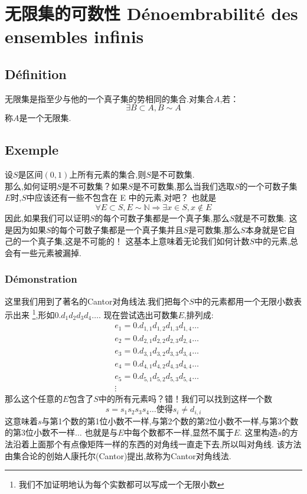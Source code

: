 \documentclass[12pt, a4paper, oneside]{ctexbook}
\begin{document}
\section{无限集的可数性 Dénoembrabilité des ensembles infinis}
  \subsection{Définition}
  无限集是指至少与他的一个真子集的势相同的集合.对集合$A$,若：
  $$
    \exists B\subset A, B\sim A
  $$
  称$A$是一个无限集.
  \subsection{Exemple}
  设$S$是区间$(0,1)$上所有元素的集合,则$S$是不可数集.\\

  那么,如何证明$S$是不可数集？如果$S$是不可数集,那么当我们选取$S$的一个可数子集$E$时,$S$中应该还有一些不包含在 E 中的元素,对吧？
  也就是
  $$
    \forall E\subset S,E\sim \mathbb{N}\Rightarrow \exists x\in S,x\notin E 
  $$
  因此,如果我们可以证明$S$的每个可数子集都是一个真子集,那么$S$就是不可数集.
  这是因为如果$S$的每个可数子集都是一个真子集并且$S$是可数集,那么$S$本身就是它自己的一个真子集,这是不可能的！
  这基本上意味着无论我们如何计数$S$中的元素,总会有一些元素被漏掉.
  \subsubsection{Démonstration}
  这里我们用到了著名的Cantor对角线法.我们把每个$S$中的元素都用一个无限小数表示出来
  \footnote{我们不加证明地认为每个实数都可以写成一个无限小数},形如$0.d_1d_2d_3d_4\dots$.
  现在尝试选出可数集$E$,排列成:
  $$
  \begin{aligned}&
    e_1=0.d_{1,1}d_{1,2}d_{1,3}d_{1,4}\dots\\ &
    e_2=0.d_{2,1}d_{2,2}d_{2,3}d_{2,4}\dots\\ &
    e_3=0.d_{3,1}d_{3,2}d_{3,3}d_{3,4}\dots\\ &
    e_4=0.d_{4,1}d_{4,2}d_{4,3}d_{4,4}\dots\\ &
    e_5=0.d_{5,1}d_{5,2}d_{5,3}d_{5,4}\dots\\ &
    \vdots 
      \end{aligned}
  $$
  那么这个任意的$E$包含了$S$中的所有元素吗？错！我们可以找到这样一个数
  $$s=s_1s_2s_3s_4\dots\text{使得}s_i\neq d_{i,i}$$
  这意味着$s$与第1个数的第1位小数不一样,与第2个数的第2位小数不一样,与第3个数的第3位小数不一样$\dots$
  也就是与$E$中每个数都不一样,显然不属于$E$.
  这里构造$s$的方法沿着上面那个有点像矩阵一样的东西的对角线一直走下去,所以叫对角线.
  该方法由集合论的创始人康托尔(Cantor)提出,故称为Cantor对角线法.
\end{document}
